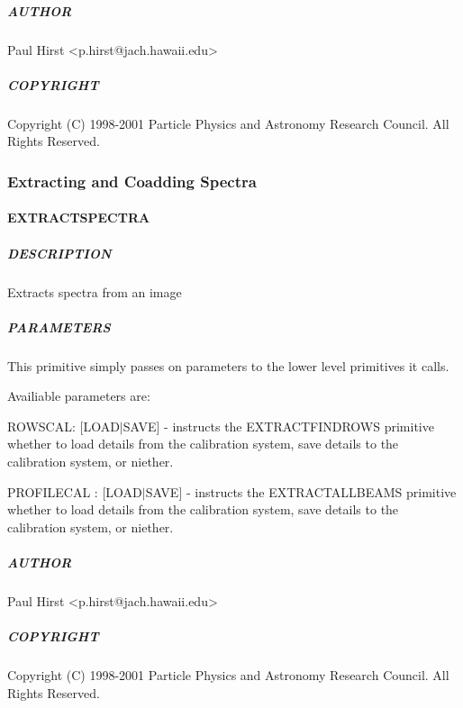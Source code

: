 \documentclass[twoside,11pt]{article}
\renewcommand{\_}{\texttt{\symbol{95}}}
\begin{document}
\subparagraph*{AUTHOR\label{_PAIRWISE_GROUP__AUTHOR}}

Paul Hirst <p.hirst@jach.hawaii.edu>

\subparagraph*{COPYRIGHT\label{_PAIRWISE_GROUP__COPYRIGHT}}

Copyright (C) 1998-2001 Particle Physics and Astronomy Research
Council. All Rights Reserved.


\subsubsection{Extracting and Coadding Spectra}

\paragraph*{\_EXTRACT\_SPECTRA\_\label{_EXTRACT_SPECTRA_}}



\subparagraph*{DESCRIPTION\label{_EXTRACT_SPECTRA__DESCRIPTION}}

Extracts spectra from an image

\subparagraph*{PARAMETERS\label{_EXTRACT_SPECTRA__PARAMETERS}}

This primitive simply passes on parameters to the lower level
primitives it calls.



Availiable parameters are:



ROWSCAL: [LOAD$|$SAVE] - instructs the \_EXTRACT\_FIND\_ROWS\_ primitive
whether to load details from the calibration system, save details to
the calibration system, or niether.



PROFILECAL : [LOAD$|$SAVE] - instructs the \_EXTRACT\_ALL\_BEAMS\_ primitive
whether to load details from the calibration system, save details to
the calibration system, or niether.

\subparagraph*{AUTHOR\label{_EXTRACT_SPECTRA__AUTHOR}}

Paul Hirst <p.hirst@jach.hawaii.edu>

\subparagraph*{COPYRIGHT\label{_EXTRACT_SPECTRA__COPYRIGHT}}

Copyright (C) 1998-2001 Particle Physics and Astronomy Research
Council. All Rights Reserved.
\end{document}
